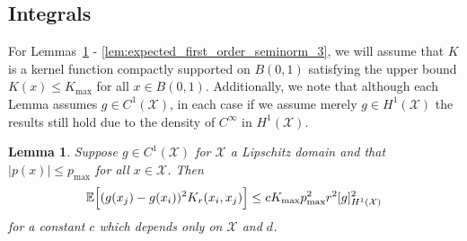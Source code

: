 \documentclass{article}
\newcommand{\abs}[1]{\left \lvert #1 \right \rvert}
\newcommand{\1}{\mathbf{1}}
\newcommand{\Xset}{\mathcal{X}}
\newcommand{\Ebb}{\mathbb{E}}
\theoremstyle{alden}
\theoremstyle{aldenthm}
\newtheorem{lemma}{Lemma}
\theoremstyle{definition}
\theoremstyle{remark}
\begin{document}
\subsection{Integrals}

For Lemmas~\ref{lem:expected_first_order_seminorm} - \ref{lem:expected_first_order_seminorm_3}, we will assume that $K$ is a kernel function compactly supported on $B(0,1)$ satisfying the upper bound $K(x) \leq K_{\max}$ for all $x \in B(0,1)$. Additionally, we note that although each Lemma assumes $g \in C^1(\Xset)$, in each case if we assume merely $g \in H^1(\Xset)$ the results still hold due to the density of $C^{\infty}$ in $H^1(\Xset)$.

\begin{lemma}
	\label{lem:expected_first_order_seminorm}
	Suppose $g \in C^{1}(\Xset)$ for $\Xset$ a Lipschitz domain and that $\abs{p(x)} \leq p_{\max}$ for all $x \in \Xset$. Then
	\begin{equation*}
	\Ebb\Bigl[(g(x_j) - g(x_i))^2K_r(x_i,x_j)\Bigr] \leq c K_{\max} p_{\max}^2 r^2 [g]_{H^1(\Xset)}^2
	\end{equation*}
	for a constant $c$ which depends only on $\Xset$ and $d$.
\end{lemma}
\end{document}
